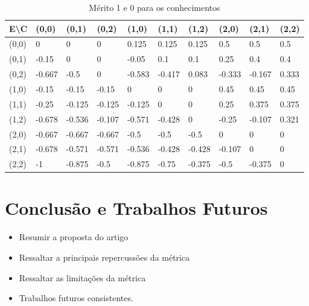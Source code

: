 \documentclass[preprint,12pt]{elsarticle}
\begin{document}
\begin{table}[htp]
\caption{Mérito 1 e 0 para os conhecimentos}
\label{table:merit-0-and-1}
\centering
\begin{tabular}{@{}llllllllll@{}}
\toprule
E\textbackslash C & (0,0) & (0,1) & (0,2) & (1,0) & (1,1) & (1,2) & (2,0) & (2,1) & (2,2) \\ \midrule
(0,0) & 0  & 0  & 0  & 0.125  & 0.125  & 0.125  & 0.5  & 0.5  & 0.5 \\
(0,1) & -0.15  & 0  & 0  & -0.05  & 0.1  & 0.1  & 0.25  & 0.4  & 0.4 \\
(0,2) & -0.667  & -0.5  & 0  & -0.583  & -0.417  & 0.083  & -0.333  & -0.167  & 0.333 \\
(1,0) & -0.15  & -0.15  & -0.15  & 0  & 0  & 0  & 0.45  & 0.45  & 0.45 \\
(1,1) & -0.25  & -0.125  & -0.125  & -0.125  & 0  & 0  & 0.25  & 0.375  & 0.375 \\
(1,2) & -0.678  & -0.536  & -0.107  & -0.571  & -0.428  & 0  & -0.25  & -0.107  & 0.321 \\
(2,0) & -0.667  & -0.667  & -0.667  & -0.5  & -0.5  & -0.5  & 0  & 0  & 0 \\
(2,1) & -0.678  & -0.571  & -0.571  & -0.536  & -0.428  & -0.428  & -0.107  & 0  & 0 \\
(2,2) & -1  & -0.875  & -0.5  & -0.875  & -0.75  & -0.375  & -0.5  & -0.375  & 0 \\ \bottomrule
\end{tabular}
\end{table}

\newpage

\section{Conclusão e Trabalhos Futuros}
\label{sec:sample5}
\begin{itemize}
\item Resumir a proposta do artigo
\item Ressaltar a principais repercussões da métrica 
\item Ressaltar as limitações da métrica
\item Trabalhos futuros consistentes.
\end{itemize}
\appendix

\end{document}
